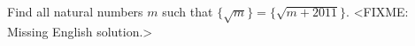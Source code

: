 \problem
Find all natural numbers $m$ such that
$\{ \sqrt{m} \} = \{ \sqrt{m+2011} \}$.
\solution
<FIXME: Missing English solution.>
\endproblem
